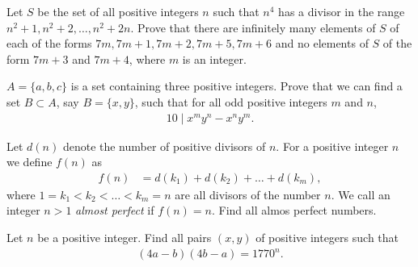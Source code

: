 \documentclass[problems.tex]{subfile}
\begin{document}
	
	
	
	\begin{problem}
		Let $S$ be the set of all positive integers $n$ such that $n^4$ has a divisor in the range $n^2 +1, n^2 + 2,\dots,n^2 + 2n$. Prove that there are infinitely many elements of $S$ of each of the forms $7m, 7m+1, 7m+2, 7m+5, 7m+6$ and no elements of $S$ of the form $7m+3$ and $7m+4$, where $m$ is an integer. %
	\end{problem}
	
	
	
	
	\begin{problem}
		$A=\{a,b,c\}$ is a set containing three positive integers. Prove that we can find a set $B \subset A$, say $B=\{x,y\}$, such that for all odd positive integers $m$ and $n$,
		\begin{align*}
			10 \mid x^m y^n - x^n y^m.
		\end{align*}
	\end{problem}
	
	
	
	\begin{problem}
		Let $d(n)$ denote the number of positive divisors of $n$. For a positive integer $n$ we define $f(n)$ as
		\begin{align*}
			f(n) & = d(k_1) + d(k_2) + \dots + d(k_m),
		\end{align*}
		where $ 1=k_1 < k_2 < \dots < k_m=n$ are all divisors of the number $n$. We call an integer $n>1$ \textit{almost perfect} if $f(n)=n$. Find all almos perfect numbers.
	\end{problem}
	
	
	
	\begin{problem}
		Let $n$ be a positive integer. Find all pairs $(x,y)$ of positive integers such that
		\begin{align*}
			(4a-b)(4b-a)=1770^n.
		\end{align*}
	\end{problem}
	
\end{document}
